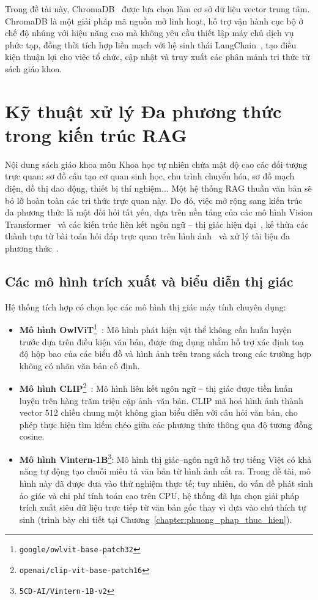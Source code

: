 Trong đề tài này, ChromaDB~\cite{chromadb2023} được lựa chọn làm cơ sở dữ liệu vector trung tâm. ChromaDB là một giải pháp mã nguồn mở linh hoạt, hỗ trợ vận hành cục bộ ở chế độ nhúng với hiệu năng cao mà không yêu cầu thiết lập máy chủ dịch vụ phức tạp, đồng thời tích hợp liền mạch với hệ sinh thái LangChain~\cite{langchain2022}, tạo điều kiện thuận lợi cho việc tổ chức, cập nhật và truy xuất các phân mảnh tri thức từ sách giáo khoa.

\section{Kỹ thuật xử lý Đa phương thức trong kiến trúc RAG}
Nội dung sách giáo khoa môn Khoa học tự nhiên chứa mật độ cao các đối tượng trực quan: sơ đồ cấu tạo cơ quan sinh học, chu trình chuyển hóa, sơ đồ mạch điện, đồ thị dao động, thiết bị thí nghiệm... Một hệ thống RAG thuần văn bản sẽ bỏ lỡ hoàn toàn các tri thức trực quan này. Do đó, việc mở rộng sang kiến trúc đa phương thức là một đòi hỏi tất yếu, dựa trên nền tảng của các mô hình Vision Transformer~\cite{dosovitskiy2021vit} và các kiến trúc liên kết ngôn ngữ -- thị giác hiện đại~\cite{radford2021clip, li2022blip, liu2024llava, li2023blip2, alayrac2022flamingo}, kế thừa các thành tựu từ bài toán hỏi đáp trực quan trên hình ảnh~\cite{antol2015vqa} và xử lý tài liệu đa phương thức~\cite{cui2021documentai, huang2022layoutlmv3}.

\subsection{Các mô hình trích xuất và biểu diễn thị giác}
Hệ thống tích hợp có chọn lọc các mô hình thị giác máy tính chuyên dụng:
\begin{itemize}
    \item \textbf{Mô hình OwlViT}\footnote{\texttt{google/owlvit-base-patch32}}~\cite{minderer2022owlvit}: Mô hình phát hiện vật thể không cần huấn luyện trước dựa trên điều kiện văn bản, được ứng dụng nhằm hỗ trợ xác định toạ độ hộp bao của các biểu đồ và hình ảnh trên trang sách trong các trường hợp không có nhãn văn bản cố định.
    \item \textbf{Mô hình CLIP}\footnote{\texttt{openai/clip-vit-base-patch16}}~\cite{radford2021clip}: Mô hình liên kết ngôn ngữ -- thị giác được tiền huấn luyện trên hàng trăm triệu cặp ảnh--văn bản. CLIP mã hoá hình ảnh thành vector $512$ chiều chung một không gian biểu diễn với câu hỏi văn bản, cho phép thực hiện tìm kiếm chéo giữa các phương thức thông qua độ tương đồng cosine.
    \item \textbf{Mô hình Vintern-1B}\footnote{\texttt{5CD-AI/Vintern-1B-v2}}: Mô hình thị giác--ngôn ngữ hỗ trợ tiếng Việt có khả năng tự động tạo chuỗi miêu tả văn bản từ hình ảnh cắt ra. Trong đề tài, mô hình này đã được đưa vào thử nghiệm thực tế; tuy nhiên, do vấn đề phát sinh ảo giác và chi phí tính toán cao trên CPU, hệ thống đã lựa chọn giải pháp trích xuất siêu dữ liệu trực tiếp từ văn bản gốc thay vì dựa vào chú thích tự sinh (trình bày chi tiết tại Chương~\ref{chapter:phuong_phap_thuc_hien}).
\end{itemize}

